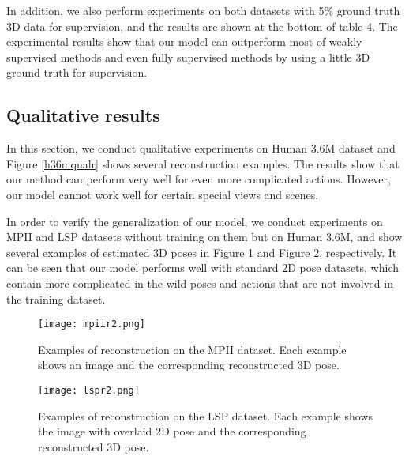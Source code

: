\documentclass[10pt,twocolumn,letterpaper]{article}
\begin{document}
In addition, we also perform experiments on both datasets with 5\% ground truth 3D data for supervision, and the results are shown at the bottom of table 4. The experimental results show that our model can outperform most of weakly supervised methods and even fully supervised methods by using a little 3D ground truth for supervision.

\subsection{Qualitative results}
In this section, we conduct qualitative experiments on Human 3.6M dataset and Figure \ref{h36mqualr} shows several reconstruction examples. The results show that our method can perform very well for even more complicated actions. However, our model cannot work well for certain special views and scenes.

In order to verify the generalization of our model, we conduct experiments on MPII and LSP datasets without training on them but on Human 3.6M, and show several examples of estimated 3D poses in Figure \ref{MPII} and Figure \ref{LSP}, respectively. It can be seen that our model performs well with standard 2D pose datasets, which contain more complicated in-the-wild poses and actions that are not involved in the training dataset.


\begin{figure}[h]
\centering
\texttt{[image: mpiir2.png]}
\caption{Examples of reconstruction on the MPII dataset. Each example shows an image and the corresponding reconstructed 3D pose.}
\label{MPII}
\end{figure}

\begin{figure}[h]
\centering
\texttt{[image: lspr2.png]}
\caption{Examples of reconstruction on the LSP dataset. Each example shows the image with overlaid 2D pose and the corresponding reconstructed 3D pose.}
\label{LSP}
\end{figure}
\end{document}
